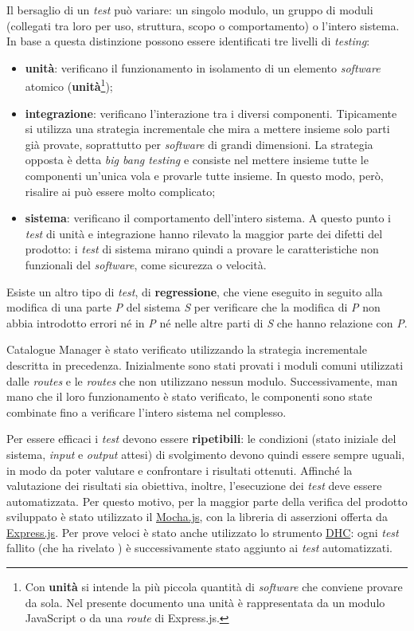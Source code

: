 Il bersaglio di un \textit{test} può variare: un singolo modulo, un gruppo di moduli (collegati tra loro per uso, struttura, scopo o comportamento) o l'intero sistema. In base a questa distinzione possono essere identificati tre livelli di \textit{testing}: 
\begin{itemize}
\item \textbf{unità}: verificano il funzionamento in isolamento di un elemento \textit{software} atomico (\textbf{unità}\footnote{Con \textbf{unità} si intende la più piccola quantità di \textit{software} che conviene provare da sola. Nel presente documento una unità è rappresentata da un modulo JavaScript o da una \textit{route} di Express.js.});
\item \textbf{integrazione}: verificano l'interazione tra i diversi componenti. Tipicamente si utilizza una strategia incrementale che mira a mettere insieme solo parti già provate, soprattutto per \textit{software} di grandi dimensioni. La strategia opposta è detta \textit{big bang testing} e consiste nel mettere insieme tutte le componenti un'unica vola e provarle tutte insieme. In questo modo, però, risalire ai  può essere molto complicato;
\item \textbf{sistema}: verificano il comportamento dell'intero sistema. A questo punto i \textit{test} di unità e integrazione hanno rilevato la maggior parte dei difetti del prodotto: i \textit{test} di sistema mirano quindi a provare le caratteristiche non funzionali del \textit{software}, come sicurezza o velocità.
\end{itemize}
Esiste un altro tipo di \textit{test}, di \textbf{regressione}, che viene eseguito in seguito alla modifica di una parte \textit{P} del sistema \textit{S} per verificare che la modifica di \textit{P} non abbia introdotto errori né in \textit{P} né nelle altre parti di \textit{S} che hanno relazione con \textit{P}.

Catalogue Manager è stato verificato utilizzando la strategia incrementale descritta in precedenza. Inizialmente sono stati provati i moduli comuni utilizzati dalle \textit{routes} e le \textit{routes} che non utilizzano nessun modulo. Successivamente, man mano che il loro funzionamento è stato verificato, le componenti sono state combinate fino a verificare l'intero sistema nel complesso. 

Per essere efficaci i \textit{test} devono essere \textbf{ripetibili}: le condizioni (stato iniziale del sistema, \textit{input} e \textit{output} attesi) di svolgimento devono quindi essere sempre uguali, in modo da poter valutare e confrontare i risultati ottenuti. Affinché la valutazione dei risultati sia obiettiva, inoltre, l'esecuzione dei \textit{test} deve essere automatizzata. Per questo motivo, per la maggior parte della verifica del prodotto sviluppato è stato utilizzato il  \hyperref[mocha]{Mocha.js}, con la libreria di asserzioni offerta da \hyperref[express]{Express.js}. Per prove veloci è stato anche utilizzato lo strumento \hyperref[dhc]{DHC}: ogni \textit{test} fallito (che ha rivelato ) è successivamente stato aggiunto ai \textit{test} automatizzati.

